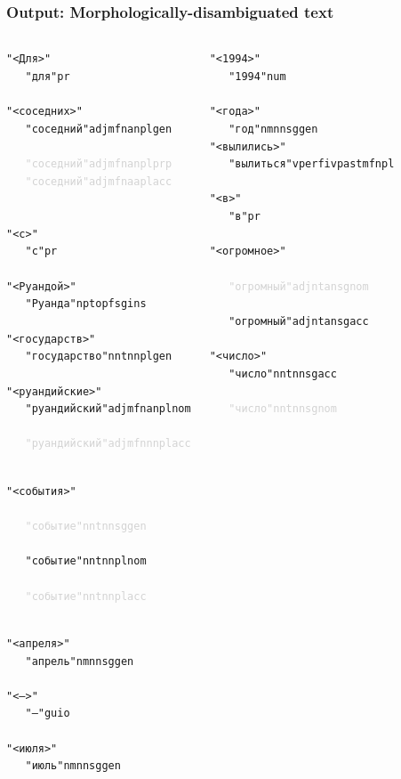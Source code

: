 \documentclass{beamer}
\begin{document}
\begin{frame}
    \frametitle{Output: Morphologically-disambiguated text}

\begin{columns}
\begin{tiny}
\begin{alltt}
"<Для>"\\
~~~"для" pr
~\\
"<соседних>"\\
~~~"соседний" adj mfn an pl gen\\
\textcolor{lightgray}{
~~~"соседний" adj mfn an pl prp\\
~~~"соседний" adj mfn aa pl acc
}
~\\
"<с>"\\
~~~"с" pr
~\\
"<Руандой>"\\
~~~"Руанда" np top f sg ins
~\\
"<государств>"\\
~~~"государство" n nt nn pl gen
~\\
"<руандийские>"\\
~~~"руандийский" adj mfn an pl nom\\
\textcolor{lightgray}{
~~~"руандийский" adj mfn nn pl acc
}

~\\
"<события>"\\
\textcolor{lightgray}{
~~~"событие" n nt nn sg gen\\
}
~~~"событие" n nt nn pl nom\\
\textcolor{lightgray}{
~~~"событие" n nt nn pl acc
}

~\\
"<апреля>"\\
~~~"апрель" n m nn sg gen
~\\
"<–>"\\
~~~"–" guio
~\\
"<июля>"\\
~~~"июль" n m nn sg gen
~\\
\end{alltt}
\end{tiny}
\begin{tiny}
\begin{alltt}
"<1994>"\\
~~~"1994" num
~\\
"<года>"\\
~~~"год" n m nn sg gen\\
"<вылились>"\\
~~~"вылиться" v perf iv past mfn pl
~\\
"<в>"\\
~~~"в" pr
~\\
"<огромное>"\\
\textcolor{lightgray}{
~~~"огромный" adj nt an sg nom\\
}
~~~"огромный" adj nt an sg acc
~\\
"<число>"\\
~~~"число" n nt nn sg acc\\
\textcolor{lightgray}{
~~~"число" n nt nn sg nom
}


\end{alltt}
\end{tiny}
\end{columns}
\end{frame}
\end{document}
